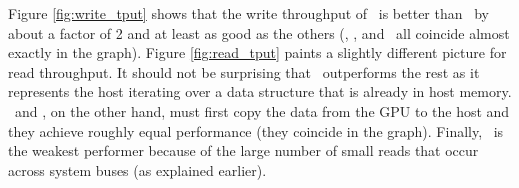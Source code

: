 Figure \ref{fig:write_tput} shows that the write throughput of \dmh\
is better than \hd\ by about a factor of 2 and at least as good as the others (\hp, \dm, and \dmh\ all coincide
almost exactly in the graph). Figure \ref{fig:read_tput} paints a
slightly different picture for read throughput. It should not be
surprising that \hp\ outperforms the rest as it represents the host
iterating over a data structure that is already in host memory. \hd\
and \dmh, on the other hand, must first copy the data from the GPU to
the host and they achieve roughly equal performance (they coincide in
the graph). Finally, \dm\ is
the weakest performer because of the large number of small reads that
occur across system buses (as explained earlier).
